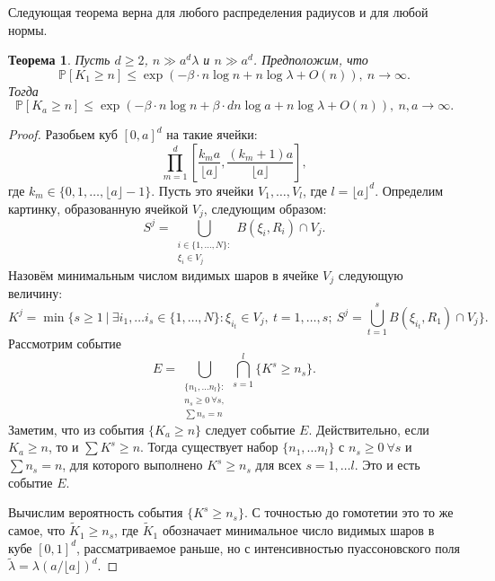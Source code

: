 \documentclass[12pt]{article}
\theoremstyle{plain}
\newtheorem{thm}{Теорема} %
\theoremstyle{definition}
\theoremstyle{remark}
\def\geq{\geqslant}
\def\leq{\leqslant}
\newcommand{\cuplim}{\bigcup\limits}
\newcommand{\PP}{\mathbb{P}}
\newcommand{\til}{\widetilde}
\begin{document}
Следующая теорема верна для любого распределения радиусов и для любой нормы. 
\begin{thm}
Пусть $d\geq 2$,  $n \gg a^d\lambda$ и $n \gg a^d$. 
Предположим, что 
\begin{equation*}
    \PP[K_1 \geq n] \leq \exp \left(-\beta\cdot n\log n + n\log\lambda + O(n)\right),\  n \to \infty.
\end{equation*}{}
Тогда 
\begin{equation*}
    \PP[K_a \geq n] \leq \exp \left(-\beta\cdot n\log n + \beta\cdot dn\log a + n\log\lambda + O(n)\right),\  n, a \to \infty.
\end{equation*}{}
\end{thm}

\begin{proof}
Разобьем куб $[0, a]^d$ на такие ячейки:
\begin{equation*}
    \prod_{m = 1}^d\left[\dfrac{k_m a}{\lfloor a \rfloor}, \dfrac{(k_m + 1)a}{\lfloor a \rfloor}\right],
\end{equation*}{}
где $k_m\in \{0, 1, \ldots, \lfloor a\rfloor - 1\}$. Пусть это ячейки $V_1, \ldots, V_l$, где $l = \lfloor a\rfloor ^d$. 
Определим картинку, образованную ячейкой $V_j$, следующим образом:
\begin{equation*}
    S^j = \cuplim_{\substack{i\in \{1, \ldots, N\}\colon\\ \xi_i\in V_j}} B(\xi_i, R_i) \cap V_j.
\end{equation*}{}
Назовём минимальным числом видимых шаров в ячейке $V_j$ следующую величину:
\begin{equation*}
    K^j = \min\{s\geq 1\ |\ \exists i_1, \ldots i_s \in \{1, \ldots, N\} \colon \xi_{i_t}\in V_j,\ t = 1, \ldots, s;\ S^j = \bigcup_{t = 1}^s B(\xi_{i_t}, R_1)\cap V_j\}.
\end{equation*}{}
Рассмотрим событие
\begin{equation*}
    E = \bigcup_{\substack{\{n_1, \ldots n_l\}\colon\\ n_s \geq 0\ \forall s,\\ \sum n_s = n}} \bigcap_{s = 1}^l \{K^s \geq n_s\}.
\end{equation*}{}
Заметим, что из события $\{K_a \geq n\}$ следует событие $E$. Действительно, если $K_a \geq n$, то и $\sum K^s \geq n$. Тогда существует набор $\{n_1, \ldots n_l\}$ с $n_s \geq 0\ \forall s$ и $\sum n_s = n$, для которого выполнено $K^s \geq n_s$ для всех $s = 1, \ldots l$. Это и есть событие $E$.

Вычислим вероятность события $\{K^s \geq n_s\}$. 
С точностью до гомотетии это то же самое, что $\til K_1 \geq n_s$, где $\til K_1$ обозначает минимальное число видимых шаров в кубе $[0, 1]^d$, рассматриваемое раньше, но с интенсивностью пуассоновского поля $\til\lambda = \lambda (a/\lfloor a\rfloor)^d$. 


\end{proof}
\end{document}
